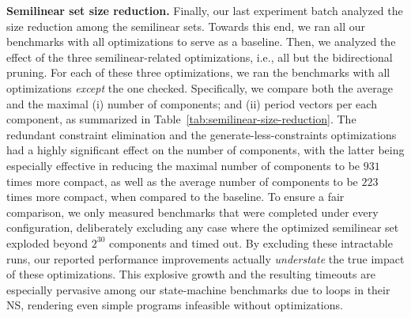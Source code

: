 \smallskip
\noindent
\textbf{Semilinear set size reduction.}
%
Finally, our last experiment batch analyzed the size reduction among the semilinear sets.
%
Towards this end, we ran all our benchmarks with all optimizations to serve as a baseline. 
%
Then, we analyzed the effect of the three semilinear-related optimizations, i.e., all but the bidirectional pruning. For each of these three optimizations, we ran the benchmarks with all optimizations \textit{except} the one checked.
%
%
Specifically, we compare both the average and the maximal (i) number of components; and (ii) period vectors per each component, as summarized in Table~\ref{tab:semilinear-size-reduction}.
%
The redundant constraint elimination and the generate-less-constraints optimizations had a highly significant effect on the number of components, with the latter being especially effective in reducing the maximal number of components to be $931$ times more compact, as well as the average number of components to be $223$ times more compact, when compared to the baseline.
%
To ensure a fair comparison, we only measured benchmarks that were completed under every configuration, deliberately excluding any case where the optimized semilinear set exploded beyond $2^{30}$ components and timed out. By excluding these intractable runs, our reported performance improvements actually \textit{understate} the true impact of these optimizations. This explosive growth and the resulting timeouts are especially pervasive among our state-machine benchmarks due to loops in their NS, rendering even simple programs infeasible without optimizations.




